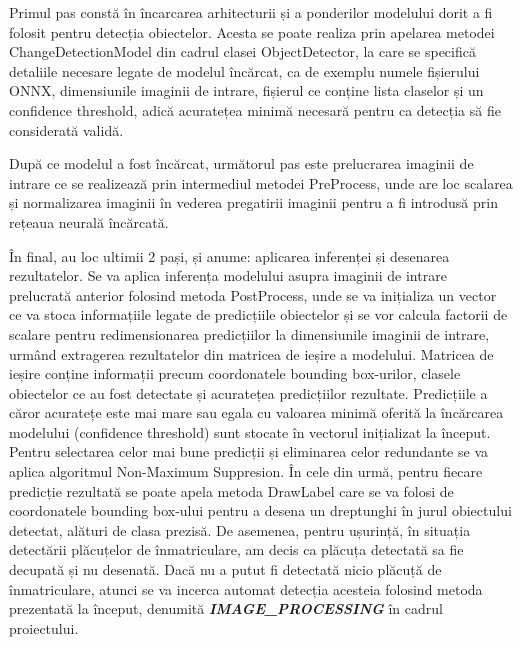 \documentclass[12pt]{article}
\begin{document}
Primul pas const\u{a} \^{i}n \^{i}ncarcarea arhitecturii și a ponderilor modelului dorit a fi folosit pentru detecția obiectelor. Acesta se poate realiza prin apelarea metodei ChangeDetectionModel din cadrul clasei ObjectDetector, la care se specific\u{a} detaliile necesare legate de modelul \^{i}nc\u{a}rcat, ca de exemplu numele fișierului ONNX, dimensiunile imaginii de intrare, fișierul ce conține lista claselor și un confidence threshold, adic\u{a} acuratețea minim\u{a} necesar\u{a} pentru ca detecția s\u{a} fie considerat\u{a} valid\u{a}.

Dup\u{a} ce modelul a fost \^{i}nc\u{a}rcat, urm\u{a}torul pas este prelucrarea imaginii de intrare ce se realizeaz\u{a} prin intermediul metodei PreProcess, unde are loc scalarea și normalizarea imaginii \^{i}n vederea pregatirii imaginii pentru a fi introdus\u{a} prin rețeaua neural\u{a} \^{i}nc\u{a}rcat\u{a}.

\^{I}n final, au loc ultimii 2 pași, și anume: aplicarea inferenței și desenarea rezultatelor. Se va aplica inferența modelului asupra imaginii de intrare prelucrat\u{a} anterior folosind metoda PostProcess, unde se va inițializa un vector ce va stoca informațiile legate de predicțiile obiectelor și se vor calcula factorii de scalare pentru redimensionarea predicțiilor la dimensiunile imaginii de intrare, urm\^{a}nd extragerea rezultatelor din matricea de ieșire a modelului. Matricea de ieșire conține informații precum coordonatele bounding box-urilor, clasele obiectelor ce au fost detectate și acuratețea predicțiilor rezultate. Predicțiile a c\u{a}ror acuratețe este mai mare sau egala cu valoarea minim\u{a} oferit\u{a} la \^{i}nc\u{a}rcarea modelului (confidence threshold) sunt stocate \^{i}n vectorul inițializat la \^{i}nceput. Pentru selectarea celor mai bune predicții și eliminarea celor redundante se va aplica algoritmul Non-Maximum Suppresion. \^{I}n cele din urm\u{a}, pentru fiecare predicție rezultat\u{a} se poate apela metoda DrawLabel care se va folosi de coordonatele bounding box-ului pentru a desena un dreptunghi \^{i}n jurul obiectului detectat, al\u{a}turi de clasa prezis\u{a}. De asemenea, pentru ușurinț\u{a}, \^{i}n situația detect\u{a}rii pl\u{a}cuțelor de \^{i}nmatriculare, am decis ca pl\u{a}cuța detectat\u{a} sa fie decupat\u{a} și nu desenat\u{a}. Dac\u{a} nu a putut fi detectat\u{a} nicio pl\u{a}cuț\u{a} de \^{i}nmatriculare, atunci se va incerca automat detecția acesteia folosind metoda prezentat\u{a} la \^{i}nceput, denumit\u{a} \textbf{\textit{IMAGE\_PROCESSING}} \^{i}n cadrul proiectului.
\end{document}
